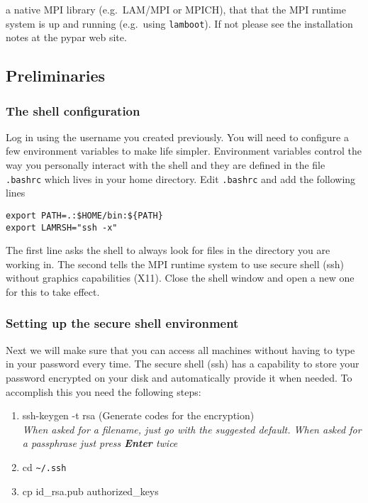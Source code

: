        
a native MPI library (e.g.\ LAM/MPI or MPICH),
that 
that the MPI runtime system is up and running (e.g.\ using \texttt{lamboot}).
If not please see the installation notes at the pypar web site.

        

\subsection*{Preliminaries}

\subsubsection*{The shell configuration}
Log in using the username you created previously.
You will need to configure a few environment variables to make 
life simpler.
Environment variables control the way you personally interact with the
shell and they are defined in the file \texttt{.bashrc} which lives in
your home directory. Edit \texttt{.bashrc} and add the following lines

\begin{verbatim}
export PATH=.:$HOME/bin:${PATH}
export LAMRSH="ssh -x"
\end{verbatim}

The first line asks the shell to always look for files in the directory
you are working in. The second tells the MPI runtime system to use 
secure shell (ssh) without graphics capabilities (X11). 
Close the shell window and open a new one for this to take effect.  

\subsubsection*{Setting up the secure shell environment}

Next we will make sure that you can access all machines without having to
type in your password every time. The secure shell (ssh) has a capability
to store your password encrypted on your disk and automatically provide
it when needed. To accomplish this you need the following steps:

\begin{enumerate} 
  \item ssh-keygen -t rsa (Generate codes for the encryption)\\
  \emph{When asked for a filename, just go with the suggested default.
  When asked for a passphrase just press \textbf{Enter} twice}
  \item cd \verb+~/.ssh+  
  \item cp id\_rsa.pub authorized\_keys   
\end{enumerate}

